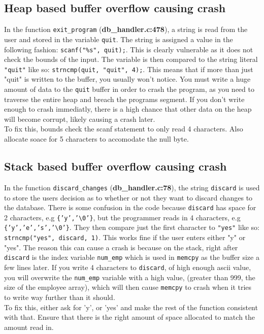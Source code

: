 \documentclass[]{article}
\begin{document}
\subsection*{Heap based buffer overflow causing crash}
In the function \texttt{exit\_program} (\textbf{db\_handler.c:478}), a string is read from the user and stored in the variable \texttt{quit}. The string is assigned a value in the following fashion: \texttt{scanf("\%s", quit);}. This is clearly vulnerable as it does not check the bounds of the input. The variable is then compared to the string literal \texttt{"quit"} like so: \texttt{strncmp(quit, "quit", 4);}. This means that if more than just "quit" is written to the buffer, you usually won't notice. You must write a huge amount of data to the \texttt{quit} buffer in order to crash the program, as you need to traverse the entire heap and breach the programs segment. If you don't write enough to crash immediatly, there is a high chance that other data on the heap will become corrupt, likely causing a crash later.
\\
To fix this, bounds check the scanf statement to only read 4 characters. Also allocate soace for 5 characters to accomodate the null byte.

\subsection*{Stack based buffer overflow causing crash}
In the function \texttt{discard\_changes} (\textbf{db\_handler.c:78}), the string \texttt{discard} is used to store the users decision as to whether or not they want to discard changes to the database. There is some confusion in the code because \texttt{discard} has space for 2 characters, e.g \texttt{\{'y','\textbackslash0'\}}, but the programmer reads in 4 characters, e.g \texttt{\{'y','e','s','\textbackslash0'\}}. They then compare just the first character to \texttt{"yes"} like so: \texttt{strncmp("yes", discard, 1)}. This works fine if the user enters either "y" or "yes". The reason this can cause a crash is because on the stack, right after \texttt{discard} is the index variable \texttt{num\_emp} which is used in \texttt{memcpy} as the buffer size a few lines later. If you write 4 characters to \texttt{discard}, of high enough ascii value, you will overwrite the \texttt{num\_emp} variable with a high value, (greater than 999, the size of the employee array), which will then cause \texttt{memcpy} to crash when it tries to write way further than it should.
\\
To fix this, either ask for 'y', or 'yes' and make the rest of the function consistent with that. Ensure that there is the right amount of space allocated to match the amount read in.
\end{document}
